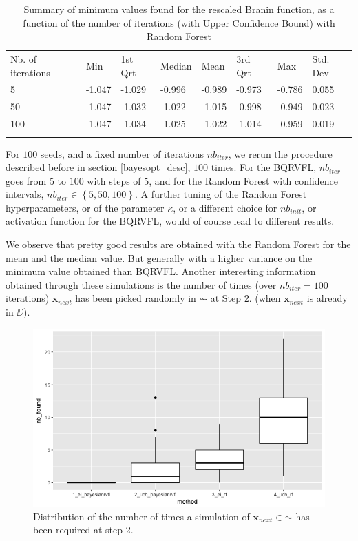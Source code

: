 \begin{table}[!htb]
\begin{center}
\caption{Summary of minimum values found for the rescaled Branin function, as a function of the number of iterations (with Upper Confidence Bound) with Random Forest}
\label{tab:min_values_rf_ucb}       %
\begin{tabular}{llllllll}
\hline\noalign{\smallskip}
Nb. of iterations & Min & 1st Qrt  & Median & Mean  & 3rd Qrt  & Max & Std. Dev \\
\noalign{\smallskip}\hline\noalign{\smallskip}
  5   & -1.047 & -1.029 & -0.996 & -0.989 & -0.973 & -0.786 & 0.055 \\
  50  & -1.047 & -1.032 & -1.022 & -1.015 & -0.998 & -0.949 & 0.023 \\
  100 & -1.047 & -1.034 & -1.025 & -1.022 & -1.014 & -0.959 & 0.019 \\
\noalign{\smallskip}\hline
\end{tabular}
\end{center}
\end{table}

\newpage

For $100$ seeds, and a fixed number of iterations $nb_{iter}$, we rerun the procedure described before in section \ref{bayesopt_desc}, $100$ times. For the BQRVFL, $nb_{iter}$ goes from $5$ to $100$ with steps of $5$, and for the Random Forest with confidence intervals, $nb_{iter} \in \left \lbrace 5, 50, 100 \right \rbrace$. A further tuning of the Random Forest hyperparameters, or of the parameter $\kappa$, or a different choice for $nb_{init}$, or activation function for the BQRVFL, would of course lead to different results. 

We observe that pretty good results are obtained with the Random Forest for the mean and the median value. But generally with a higher variance on the minimum value obtained than BQRVFL. Another interesting information obtained through these simulations is the number of times (over $nb_{iter} = 100$ iterations) $\textbf{x}_{next}$ has been picked randomly in $\AC$ at Step 2. (when $\textbf{x}_{next}$ is already in $\DD$). 

\begin{figure}[!htb]
\centering
\includegraphics[width=12cm]{gfx/chapter-bayesianrvfl/nb_is_found.png}
\caption{Distribution of the number of times a simulation of $\textbf{x}_{next} \in \AC$ has been required at step 2.}
\label{nb_is_found_dist}
\end{figure}

